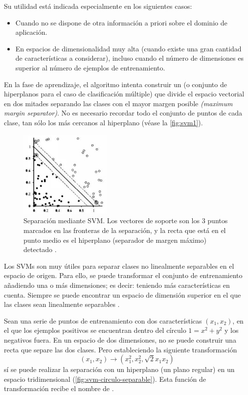 Su utilidad está indicada especialmente en los siguientes casos:
\nopagebreak
\begin{itemize}
\item Cuando no se dispone de otra información a priori sobre el dominio de aplicación.
\item En espacios de dimensionalidad muy alta (cuando existe una gran cantidad de características a considerar), incluso cuando el número de dimensiones es superior al número de ejemplos de entrenamiento.
\end{itemize}

En la fase de aprendizaje, el algoritmo intenta construir un  (o conjunto de hiperplanos para el caso de clasificación múltiple) que divide el espacio vectorial en dos mitades separando las clases con el mayor margen posible \emph{(maximum margin separator)}. No es necesario recordar todo el conjunto de puntos de cada clase, tan sólo los más cercanos al hiperplano (véase la \autoref{fig:svm1}).

\begin{figure}[htbp]
\centering
\includegraphics[width=0.4\textwidth]{svm1}
\caption[Separación mediante SVM]{Separación mediante SVM. Los vectores de soporte son los 3 puntos marcados en las fronteras de la separación, y la recta que está en el punto medio es el hiperplano (separador de margen máximo) detectado \citep{Russell2009}.}
\label{fig:svm1}
\end{figure}

Los SVMs son muy útiles para separar clases no linealmente separables en el espacio de origen. Para ello, se puede transformar el conjunto de entrenamiento añadiendo una o más dimensiones; es decir: teniendo más características en cuenta. Siempre se puede encontrar un espacio de dimensión superior en el que las clases sean linealmente separables \citep[cap. 18]{Russell2009}.

\begin{example}\label{exa:svm-circulo-separable}
Sean una serie de puntos de entrenamiento con dos características $(x_1,x_2)$, en el que los ejemplos positivos se encuentran dentro del círculo $1 = x^2 + y^2$ y los negativos fuera. En un espacio de dos dimensiones, no se puede construir una recta que separe las dos clases. Pero estableciendo la siguiente transformación
\[
\left(x_1, x_2\right) \longrightarrow \left(x_1^2, x_2^2, \sqrt{2} x_1 x_2\right)
\]
sí se puede realizar la separación con un hiperplano (un plano regular) en un espacio tridimensional (\autoref{fig:svm-circulo-separable}).
Esta función de transformación recibe el nombre de .
\end{example}

